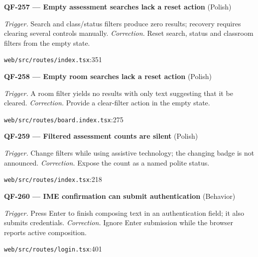 \begin{minipage}{\linewidth}
\textbf{QF-257 --- Empty assessment searches lack a reset action} {\scriptsize\color{accent}(Polish)}\par
\textit{Trigger.} Search and class/status filters produce zero results; recovery requires clearing several controls manually. \textit{Correction.} Reset search, status and classroom filters from the empty state.\par
{\scriptsize\color{muted}\nolinkurl{web/src/routes/index.tsx}:351}\par
\end{minipage}\par\vspace{7pt}
\begin{minipage}{\linewidth}
\textbf{QF-258 --- Empty room searches lack a reset action} {\scriptsize\color{accent}(Polish)}\par
\textit{Trigger.} A room filter yields no results with only text suggesting that it be cleared. \textit{Correction.} Provide a clear-filter action in the empty state.\par
{\scriptsize\color{muted}\nolinkurl{web/src/routes/board.index.tsx}:275}\par
\end{minipage}\par\vspace{7pt}
\begin{minipage}{\linewidth}
\textbf{QF-259 --- Filtered assessment counts are silent} {\scriptsize\color{accent}(Polish)}\par
\textit{Trigger.} Change filters while using assistive technology; the changing badge is not announced. \textit{Correction.} Expose the count as a named polite status.\par
{\scriptsize\color{muted}\nolinkurl{web/src/routes/index.tsx}:218}\par
\end{minipage}\par\vspace{7pt}
\begin{minipage}{\linewidth}
\textbf{QF-260 --- IME confirmation can submit authentication} {\scriptsize\color{accent}(Behavior)}\par
\textit{Trigger.} Press Enter to finish composing text in an authentication field; it also submits credentials. \textit{Correction.} Ignore Enter submission while the browser reports active composition.\par
{\scriptsize\color{muted}\nolinkurl{web/src/routes/login.tsx}:401}\par
\end{minipage}\par\vspace{7pt}
